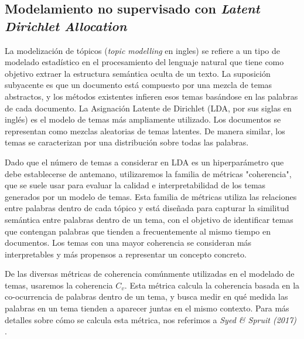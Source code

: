 \documentclass[
	spanish, %
	letterpaper, oneside
]{article}
\begin{document}
\subsection{Modelamiento no supervisado con \textit{Latent Dirichlet Allocation}}


La modelización de tópicos (\textit{topic modelling} en ingles) se refiere a un tipo de modelado estadístico en el procesamiento del lenguaje natural que tiene como objetivo extraer la estructura semántica oculta de un texto. La suposición subyacente es que un documento está compuesto por una mezcla de temas abstractos, y los métodos existentes infieren esos temas basándose en las palabras de cada documento. La Asignación Latente de Dirichlet (LDA, por sus siglas en inglés) es el modelo de temas más ampliamente utilizado. Los documentos se representan como mezclas aleatorias de temas latentes. De manera similar, los temas se caracterizan por una distribución sobre todas las palabras.

\newp Dado que el número de temas a considerar en LDA es un hiperparámetro que debe establecerse de antemano, utilizaremos la familia de métricas "coherencia", que se suele usar para evaluar la calidad e interpretabilidad de los temas generados por un modelo de temas. Esta familia de métricas utiliza las relaciones entre palabras dentro de cada tópico y está diseñada para capturar la similitud semántica entre palabras dentro de un tema, con el objetivo de identificar temas que contengan palabras que tienden a frecuentemente al mismo tiempo en documentos. Los temas con una mayor coherencia se consideran más interpretables y más propensos a representar un concepto concreto.


\newp De las diversas métricas de coherencia comúnmente utilizadas en el modelado de temas, usaremos la coherencia $C_v$. Esta métrica calcula la coherencia basada en la co-ocurrencia de palabras dentro de un tema, y busca medir en qué medida las palabras en un tema tienden a aparecer juntas en el mismo contexto. Para más detalles sobre cómo se calcula esta métrica, nos referimos a \textit{Syed \& Spruit (2017)} \cite{coherence}.
\end{document}
